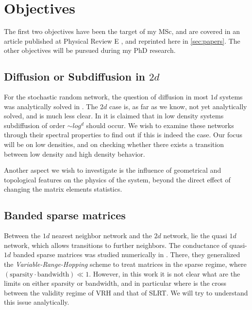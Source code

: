 \chapter{Objectives}


The first two objectives have been the target of my MSc, and are covered
in an article published at Physical Review E \cite{de_leeuw_diffusion_2012},
and reprinted here in \autoref{sec:papers}. 
The other objectives will be pursued during my PhD research.


\section{Diffusion or Subdiffusion in $2d$}

For the stochastic random network, the question of diffusion in most $1d$
systems was analytically solved in \cite{alexander_excitation_1981}. 
The $2d$ case is, as far as we know, not yet analytically solved, and is much less clear. 
In \cite{amir_localization_2010} it is claimed that in low density systems subdiffusion of
order $\sim log^d$ should occur. We wish to examine these networks through their spectral
properties to find out if this is indeed the case. Our focus will be on low densities,
and on checking whether there exists a transition between low density and high density behavior.

Another aspect we wish to investigate is the influence of geometrical and 
topological features on the physics of the system, beyond the direct 
effect of changing the matrix elements statistics.

\section{Banded sparse matrices}


Between the $1d$ nearest neighbor network and the $2d$ network,
lie the quasi $1d$ network, which allows transitions to further neighbors.
The conductance of quasi-$1d$ banded sparse matrices was studied
numerically in \cite{stotland_random-matrix_2010}.
There, they generalized the \emph{Variable-Range-Hopping} scheme to treat 
matrices in the sparse regime, where 
$(\text{sparsity}\cdot \text{bandwidth}) \ll 1$. 
However, in this work it is not clear what are the limits on either
sparsity or bandwidth, and in particular where is the cross between the 
validity regime of VRH and that of SLRT. We will try to understand this
issue analytically.



